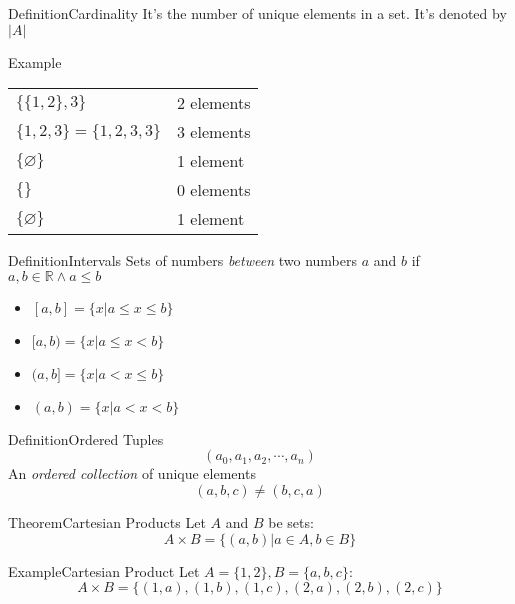 \documentclass{MathNotes}
\newenvironment{example}[1]{\begin{BlueBox}{Example}{#1}}{\end{BlueBox}}
\newenvironment{definition}[1]{\begin{RedBox}{Definition}{#1}}{\end{RedBox}}
\newenvironment{theorem}[1]{\begin{GrayBox}{Theorem}{#1}}{\end{GrayBox}}
\begin{document}
\begin{multicols}{2}
	\begin{definition}{Cardinality}\label{def:cardinality}
		It's the number of unique elements in a set. It's denoted by $\bigl|A\bigr|$
	\end{definition}
	\begin{example}{}\label{ex:cardinality}
		\begin{tabular}{ll}
			$\big\{\{1, 2\}, 3\big\}$ & 2 elements \\
			$\{1,2,3\}=\{1,2,3,3\}$   & 3 elements \\
			$\{\varnothing\}$         & 1 element  \\
			$\{\}$                    & 0 elements \\
			$\{\varnothing\}$         & 1 element
		\end{tabular}
	\end{example}
	\begin{definition}{Intervals}\label{def:intervals}
		Sets of numbers \textit{between} two numbers $a$ and $b$ if
		$a,b\in\mathbb{R}\land a\leq b$
		\begin{itemize}
			\item $[a, b]=\{x\big|a\leq x\leq b\}$
			\item $[a, b)=\{x\big|a\leq x < b\}$
			\item $(a, b]=\{x\big|a < x\leq b\}$
			\item $(a, b)=\{x\big|a < x < b\}$
		\end{itemize}
	\end{definition}
\end{multicols}

\newpage
\begin{multicols}{2}
	\begin{definition}{Ordered Tuples}\label{def:ordered-tuples}
		\[(a_0,a_1,a_2,\cdots,a_n)\]
		An \textit{ordered collection} of unique elements
		\[(a,b,c)\neq(b,c,a)\]
	\end{definition}
	\begin{theorem}{Cartesian Products}\label{th:cartesian-products}
		Let $A$ and $B$ be sets:\[A\times B=\{(a,b)\big|a\in A,b\in B\}\]
	\end{theorem}
\end{multicols}
\begin{example}{Cartesian Product}
	Let $A=\{1,2\},B=\{a,b,c\}$:
	\[A\times B=\{(1,a),(1,b),(1,c),(2,a),(2,b),(2,c)\}\]
\end{example}
\end{document}
